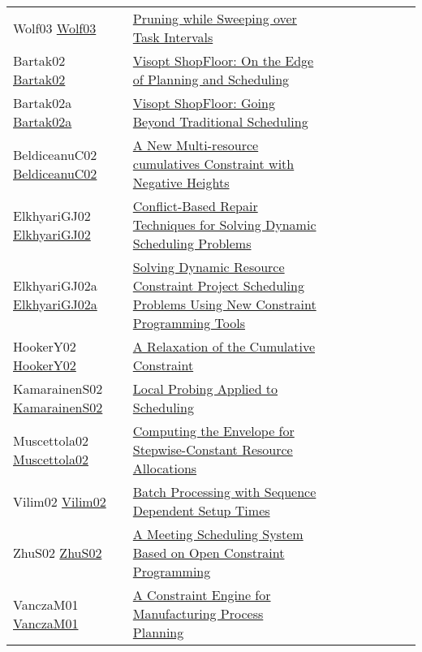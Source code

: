 {\begin{longtable}{p{3cm}p{7cm}lllllll}
Wolf03 \href{https://doi.org/10.1007/978-3-540-45193-8\_50}{Wolf03} &  \href{papers/Wolf03.pdf}{Pruning while Sweeping over Task Intervals} &  &  &  &  &  &  & \\
Bartak02 \href{https://doi.org/10.1007/3-540-46135-3\_39}{Bartak02} &  \href{papers/Bartak02.pdf}{Visopt ShopFloor: On the Edge of Planning and Scheduling} &  &  &  &  &  &  & \\
Bartak02a \href{https://doi.org/10.1007/3-540-36607-5\_14}{Bartak02a} &  \href{papers/Bartak02a.pdf}{Visopt ShopFloor: Going Beyond Traditional Scheduling} &  &  &  &  &  &  & \\
BeldiceanuC02 \href{https://doi.org/10.1007/3-540-46135-3\_5}{BeldiceanuC02} &  \href{papers/BeldiceanuC02.pdf}{A New Multi-resource cumulatives Constraint with Negative Heights} &  &  &  &  &  &  & \\
ElkhyariGJ02 \href{https://doi.org/10.1007/3-540-46135-3\_49}{ElkhyariGJ02} &  \href{papers/ElkhyariGJ02.pdf}{Conflict-Based Repair Techniques for Solving Dynamic Scheduling Problems} &  &  &  &  &  &  & \\
ElkhyariGJ02a \href{https://doi.org/10.1007/978-3-540-45157-0\_3}{ElkhyariGJ02a} &  \href{papers/ElkhyariGJ02a.pdf}{Solving Dynamic Resource Constraint Project Scheduling Problems Using New Constraint Programming Tools} &  &  &  &  &  &  & \\
HookerY02 \href{https://doi.org/10.1007/3-540-46135-3\_46}{HookerY02} &  \href{papers/HookerY02.pdf}{A Relaxation of the Cumulative Constraint} &  &  &  &  &  &  & \\
KamarainenS02 \href{https://doi.org/10.1007/3-540-46135-3\_11}{KamarainenS02} &  \href{papers/KamarainenS02.pdf}{Local Probing Applied to Scheduling} &  &  &  &  &  &  & \\
Muscettola02 \href{https://doi.org/10.1007/3-540-46135-3\_10}{Muscettola02} &  \href{papers/Muscettola02.pdf}{Computing the Envelope for Stepwise-Constant Resource Allocations} &  &  &  &  &  &  & \\
Vilim02 \href{https://doi.org/10.1007/3-540-46135-3\_62}{Vilim02} &  \href{papers/Vilim02.pdf}{Batch Processing with Sequence Dependent Setup Times} &  &  &  &  &  &  & \\
ZhuS02 \href{https://doi.org/10.1007/3-540-47961-9\_69}{ZhuS02} &  \href{papers/ZhuS02.pdf}{A Meeting Scheduling System Based on Open Constraint Programming} &  &  &  &  &  &  & \\
VanczaM01 \href{https://doi.org/10.1007/3-540-45578-7\_60}{VanczaM01} &  \href{papers/VanczaM01.pdf}{A Constraint Engine for Manufacturing Process Planning} &  &  &  &  &  &  & \\

\end{longtable}}
